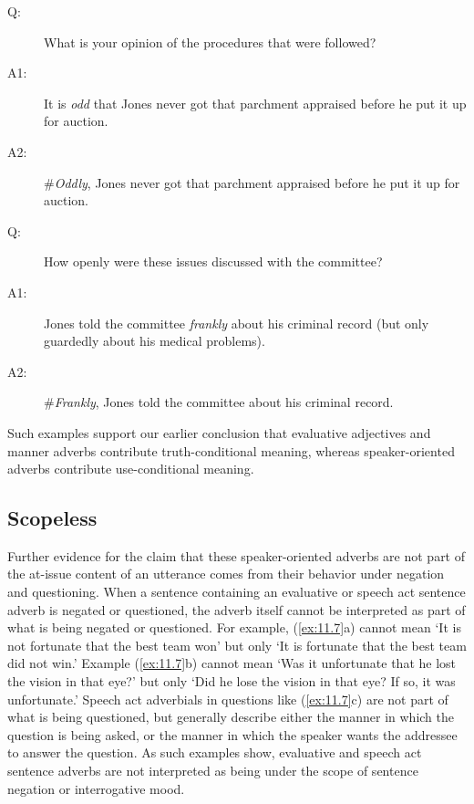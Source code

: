 \ea \label{ex:11.30}
\begin{description}
\item[Q:] What is your opinion of the procedures that were followed?\\
\item[A1:] It is \textit{odd} that Jones never got that parchment appraised before he put it up for auction.\\
\item[A2:] \#\textit{Oddly}, Jones never got that parchment appraised before he put it up for auction.\\	
\end{description}
\z


\ea \label{ex:11.31}
\begin{description}
\item[Q:] How openly were these issues discussed with the committee?\\
\item[A1:] Jones told the committee \textit{frankly} about his criminal record (but only guardedly about his medical problems).\\
\item[A2:] \#\textit{Frankly}, Jones told the committee about his criminal record.\\	
\end{description}
\z 


Such examples support our earlier conclusion that evaluative adjectives and manner adverbs contribute truth-conditional meaning, whereas speaker-oriented adverbs contribute use-conditional meaning.



\subsection*{Scopeless}


Further evidence for the claim that these speaker-oriented adverbs are not part of the at-issue content of an utterance comes from their behavior under negation and questioning. When a sentence containing an evaluative or speech act sentence adverb is negated or questioned, the adverb itself cannot be interpreted as part of what is being negated or questioned. For example, (\ref{ex:11.7}a) cannot mean ‘It is not fortunate that the best team won’ but only ‘It is fortunate that the best team did not win.’ Example (\ref{ex:11.7}b) cannot mean ‘Was it unfortunate that he lost the vision in that eye?’ but only ‘Did he lose the vision in that eye? If so, it was unfortunate.’ Speech act adverbials in questions like (\ref{ex:11.7}c) are not part of what is being questioned, but generally describe either the manner in which the question is being asked, or the manner in which the speaker wants the addressee to answer the question. As such examples show, evaluative and speech act sentence adverbs are not interpreted as being under the scope of sentence negation or interrogative mood.


